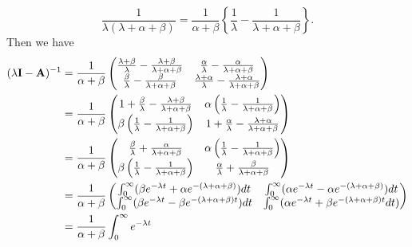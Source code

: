 \documentclass[11pt,a4paper]{article}
\begin{document}
\begin{enumerate}
\begin{enumerate}
      $$
      \frac{1}{\lambda(\lambda + \alpha + \beta)} = \frac{1}{\alpha + \beta}\left\{\frac{1}{\lambda} - \frac{1}{\lambda + \alpha + \beta}\right\}.
      $$
      Then we have
      \begin{align*}
        (\lambda\vb{I}- \vb{A})^{-1}
        &= \frac{1}{\alpha + \beta}
        \begin{pmatrix}
          \frac{\lambda + \beta}{\lambda} - \frac{\lambda + \beta}{\lambda + \alpha + \beta} & \frac{\alpha}{\lambda} - \frac{\alpha}{\lambda + \alpha + \beta}\\
          \frac{\beta}{\lambda} - \frac{\beta}{\lambda + \alpha + \beta} & \frac{\lambda + \alpha}{\lambda} - \frac{\lambda + \alpha}{\lambda + \alpha + \beta}
        \end{pmatrix}\\
        &= \frac{1}{\alpha + \beta}
        \begin{pmatrix}
          1 + \frac{\beta}{\lambda} - \frac{\lambda + \beta}{\lambda + \alpha + \beta} & \alpha\left(\frac{1}{\lambda} - \frac{1}{\lambda + \alpha + \beta}\right)\\
          \beta\left(\frac{1}{\lambda} - \frac{1}{\lambda + \alpha + \beta}\right) & 1 + \frac{\alpha}{\lambda} - \frac{\lambda + \alpha}{\lambda + \alpha + \beta}
        \end{pmatrix}\\
        &= \frac{1}{\alpha + \beta}
        \begin{pmatrix}
          \frac{\beta}{\lambda} + \frac{\alpha}{\lambda + \alpha + \beta} & \alpha\left(\frac{1}{\lambda} - \frac{1}{\lambda + \alpha + \beta}\right)\\
          \beta\left(\frac{1}{\lambda} - \frac{1}{\lambda + \alpha + \beta}\right) & \frac{\alpha}{\lambda} + \frac{\beta}{\lambda + \alpha + \beta}
        \end{pmatrix}\\
        &= \frac{1}{\alpha + \beta}
        \begin{pmatrix}
          \int_0^\infty(\beta e^{-\lambda t} + \alpha e^{-(\lambda + \alpha + \beta)})dt & \int_0^\infty(\alpha e^{-\lambda t} - \alpha e^{-(\lambda + \alpha + \beta)})dt\\
          \int_0^\infty(\beta e^{-\lambda t} - \beta e^{-(\lambda + \alpha + \beta)t})dt & \int_0^\infty(\alpha e^{-\lambda t} + \beta e^{-(\lambda + \alpha + \beta)t}dt)
        \end{pmatrix}\\
        &= \frac{1}{\alpha + \beta}\int_0^\infty e^{-\lambda t}

\end{align*}
\end{enumerate}
\end{enumerate}
\end{document}
